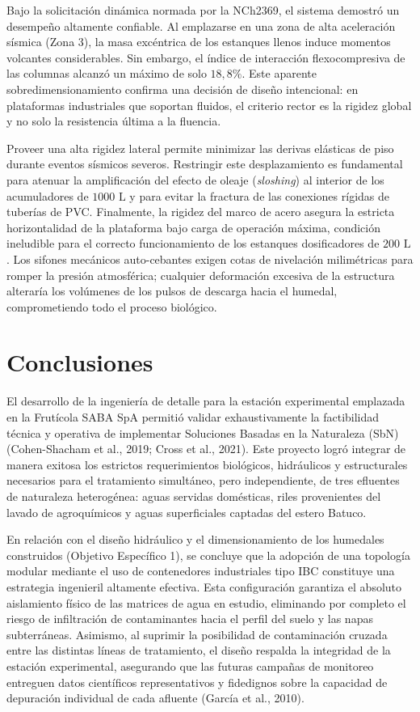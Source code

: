 \documentclass[12pt, letterpaper]{report}
\begin{document}
Bajo la solicitación dinámica normada por la NCh2369, el sistema demostró un desempeño altamente confiable. Al emplazarse en una zona de alta aceleración sísmica (Zona 3), la masa excéntrica de los estanques llenos induce momentos volcantes considerables. Sin embargo, el índice de interacción flexocompresiva de las columnas alcanzó un máximo de solo $18,8\%$. Este aparente sobredimensionamiento confirma una decisión de diseño intencional: en plataformas industriales que soportan fluidos, el criterio rector es la rigidez global y no solo la resistencia última a la fluencia. 

Proveer una alta rigidez lateral permite minimizar las derivas elásticas de piso durante eventos sísmicos severos. Restringir este desplazamiento es fundamental para atenuar la amplificación del efecto de oleaje (\textit{sloshing}) al interior de los acumuladores de $1000\text{ L}$ y para evitar la fractura de las conexiones rígidas de tuberías de PVC. Finalmente, la rigidez del marco de acero asegura la estricta horizontalidad de la plataforma bajo carga de operación máxima, condición ineludible para el correcto funcionamiento de los estanques dosificadores de $200\text{ L}$. Los sifones mecánicos auto-cebantes exigen cotas de nivelación milimétricas para romper la presión atmosférica; cualquier deformación excesiva de la estructura alteraría los volúmenes de los pulsos de descarga hacia el humedal, comprometiendo todo el proceso biológico.


\chapter{Conclusiones}

El desarrollo de la ingeniería de detalle para la estación experimental emplazada en la Frutícola SABA SpA permitió validar exhaustivamente la factibilidad técnica y operativa de implementar Soluciones Basadas en la Naturaleza (SbN) (Cohen-Shacham et al., 2019; Cross et al., 2021). Este proyecto logró integrar de manera exitosa los estrictos requerimientos biológicos, hidráulicos y estructurales necesarios para el tratamiento simultáneo, pero independiente, de tres efluentes de naturaleza heterogénea: aguas servidas domésticas, riles provenientes del lavado de agroquímicos y aguas superficiales captadas del estero Batuco.

En relación con el diseño hidráulico y el dimensionamiento de los humedales construidos (Objetivo Específico 1), se concluye que la adopción de una topología modular mediante el uso de contenedores industriales tipo IBC constituye una estrategia ingenieril altamente efectiva. Esta configuración garantiza el absoluto aislamiento físico de las matrices de agua en estudio, eliminando por completo el riesgo de infiltración de contaminantes hacia el perfil del suelo y las napas subterráneas. Asimismo, al suprimir la posibilidad de contaminación cruzada entre las distintas líneas de tratamiento, el diseño respalda la integridad de la estación experimental, asegurando que las futuras campañas de monitoreo entreguen datos científicos representativos y fidedignos sobre la capacidad de depuración individual de cada afluente (García et al., 2010).
\end{document}
